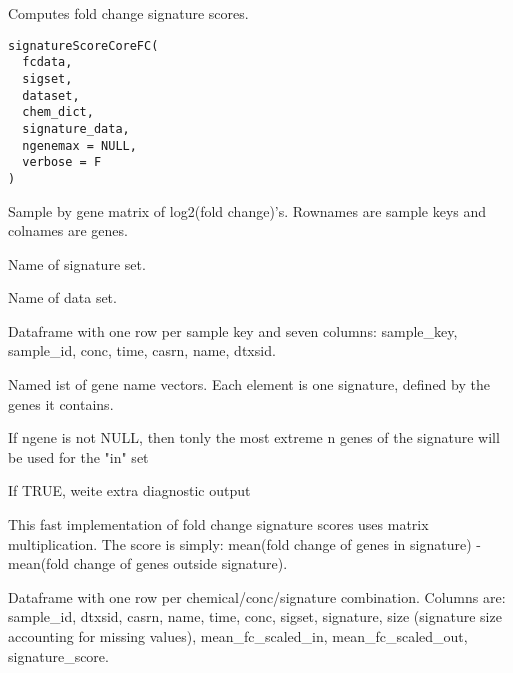 \documentclass[letterpaper]{book}
\begin{document}
%
\begin{Description}\relax
Computes fold change signature scores.
\end{Description}
%
\begin{Usage}
\begin{verbatim}
signatureScoreCoreFC(
  fcdata,
  sigset,
  dataset,
  chem_dict,
  signature_data,
  ngenemax = NULL,
  verbose = F
)
\end{verbatim}
\end{Usage}
%
\begin{Arguments}
\begin{ldescription}
\item[\code{fcdata}] Sample by gene matrix of log2(fold change)'s. Rownames are
sample keys and colnames are genes.

\item[\code{sigset}] Name of signature set.

\item[\code{dataset}] Name of data set.

\item[\code{chem\_dict}] Dataframe with one row per sample key and seven columns:
sample\_key, sample\_id, conc, time, casrn, name, dtxsid.

\item[\code{signature\_data}] Named ist of gene name vectors. Each element is one
signature, defined by the genes it contains.

\item[\code{ngenemax}] If ngene is not NULL, then tonly the most extreme n genes of the
signature will be used for the "in" set

\item[\code{verbose}] If TRUE, weite extra diagnostic output
\end{ldescription}
\end{Arguments}
%
\begin{Details}\relax
This fast implementation of fold change signature scores uses matrix
multiplication. The score is simply: mean(fold change of genes in signature) -
mean(fold change of genes outside signature).
\end{Details}
%
\begin{Value}
Dataframe with one row per chemical/conc/signature combination. Columns
are: sample\_id, dtxsid, casrn, name, time, conc, sigset,
signature, size (signature size accounting for missing values), mean\_fc\_scaled\_in,
mean\_fc\_scaled\_out, signature\_score.
\end{Value}
\end{document}
